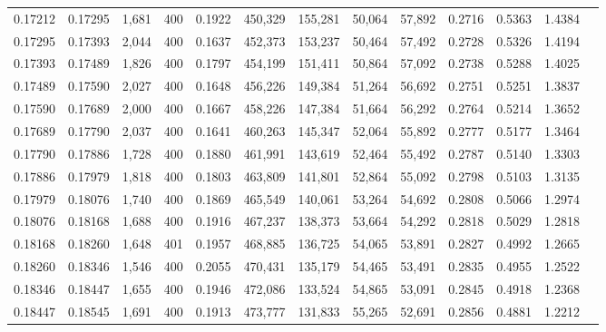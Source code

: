 \begin{tabular}{rrrrrrrrrrrrr}
0.17212 & 0.17295 &  1,681 & 400 &                                     0.1922 & 450,329 & 155,281 &  50,064 &  57,892 & 0.2716 & 0.5363 & 1.4384 \\
0.17295 & 0.17393 &  2,044 & 400 &                                     0.1637 & 452,373 & 153,237 &  50,464 &  57,492 & 0.2728 & 0.5326 & 1.4194 \\
0.17393 & 0.17489 &  1,826 & 400 &                                     0.1797 & 454,199 & 151,411 &  50,864 &  57,092 & 0.2738 & 0.5288 & 1.4025 \\
0.17489 & 0.17590 &  2,027 & 400 &                                     0.1648 & 456,226 & 149,384 &  51,264 &  56,692 & 0.2751 & 0.5251 & 1.3837 \\
0.17590 & 0.17689 &  2,000 & 400 &                                     0.1667 & 458,226 & 147,384 &  51,664 &  56,292 & 0.2764 & 0.5214 & 1.3652 \\
0.17689 & 0.17790 &  2,037 & 400 &                                     0.1641 & 460,263 & 145,347 &  52,064 &  55,892 & 0.2777 & 0.5177 & 1.3464 \\
0.17790 & 0.17886 &  1,728 & 400 &                                     0.1880 & 461,991 & 143,619 &  52,464 &  55,492 & 0.2787 & 0.5140 & 1.3303 \\
0.17886 & 0.17979 &  1,818 & 400 &                                     0.1803 & 463,809 & 141,801 &  52,864 &  55,092 & 0.2798 & 0.5103 & 1.3135 \\
0.17979 & 0.18076 &  1,740 & 400 &                                     0.1869 & 465,549 & 140,061 &  53,264 &  54,692 & 0.2808 & 0.5066 & 1.2974 \\
0.18076 & 0.18168 &  1,688 & 400 &                                     0.1916 & 467,237 & 138,373 &  53,664 &  54,292 & 0.2818 & 0.5029 & 1.2818 \\
0.18168 & 0.18260 &  1,648 & 401 &                                     0.1957 & 468,885 & 136,725 &  54,065 &  53,891 & 0.2827 & 0.4992 & 1.2665 \\
0.18260 & 0.18346 &  1,546 & 400 &                                     0.2055 & 470,431 & 135,179 &  54,465 &  53,491 & 0.2835 & 0.4955 & 1.2522 \\
0.18346 & 0.18447 &  1,655 & 400 &                                     0.1946 & 472,086 & 133,524 &  54,865 &  53,091 & 0.2845 & 0.4918 & 1.2368 \\
0.18447 & 0.18545 &  1,691 & 400 &                                     0.1913 & 473,777 & 131,833 &  55,265 &  52,691 & 0.2856 & 0.4881 & 1.2212 \\

\end{tabular}
